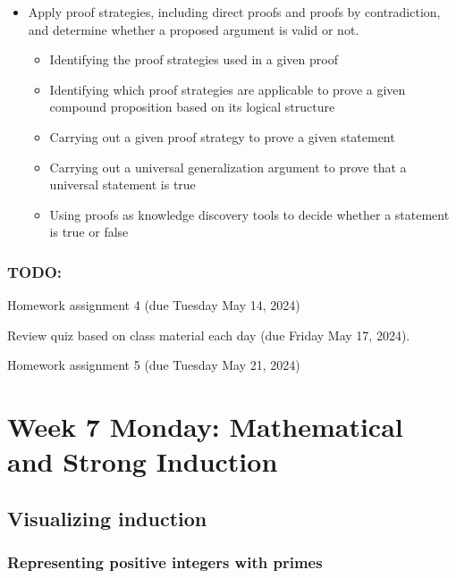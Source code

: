 \begin{itemize}
\item Apply proof strategies, including direct proofs and proofs by contradiction, and determine whether a proposed argument is valid or not.
\begin{itemize}
    \item Identifying the proof strategies used in a given proof
    \item Identifying which proof strategies are applicable to prove a given compound proposition based on its logical structure
    \item Carrying out a given proof strategy to prove a given statement
    \item Carrying out a universal generalization argument to prove that a universal statement is true
    \item Using proofs as knowledge discovery tools to decide whether a statement is true or false
\end{itemize}
\end{itemize}

\subsubsection*{TODO:}
\begin{list}
   {\itemsep2pt}
   \item Homework assignment 4 (due Tuesday May 14, 2024)
   \item Review quiz based on class material each day (due Friday May 17, 2024).
   \item Homework assignment 5 (due Tuesday May 21, 2024)
\end{list}

\newpage

\section*{Week 7 Monday: Mathematical and Strong Induction}
\subsection*{Visualizing induction}





\subsubsection*{Representing positive integers with primes}

